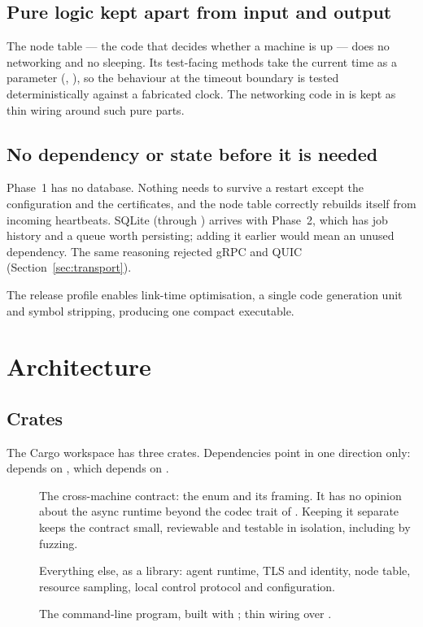\documentclass{article}
\begin{document}
\subsection{Pure logic kept apart from input and output}

The node table --- the code that decides whether a machine is up --- does
no networking and no sleeping. Its test-facing methods take the current
time as a parameter (, ), so
the behaviour at the timeout boundary is tested deterministically against
a fabricated clock. The networking code in  is kept as
thin wiring around such pure parts.

\subsection{No dependency or state before it is needed}

Phase~1 has no database. Nothing needs to survive a restart except the
configuration and the certificates, and the node table correctly rebuilds
itself from incoming heartbeats. SQLite (through ) arrives
with Phase~2, which has job history and a queue worth persisting; adding
it earlier would mean an unused dependency. The same reasoning rejected
gRPC and QUIC (Section~\ref{sec:transport}).

The release profile enables link-time optimisation, a single code
generation unit and symbol stripping, producing one compact executable.

\section{Architecture}

\subsection{Crates}

The Cargo workspace has three crates. Dependencies point in one direction
only:  depends on , which depends on
.

\begin{description}
  \item[] The cross-machine contract: the
     enum and its framing. It has no opinion about the async
    runtime beyond the codec trait of . Keeping it
    separate keeps the contract small, reviewable and testable in
    isolation, including by fuzzing.
  \item[] Everything else, as a library: agent
    runtime, TLS and identity, node table, resource sampling, local
    control protocol and configuration.
  \item[] The command-line program, built with
    ; thin wiring over .
\end{description}
\end{document}
